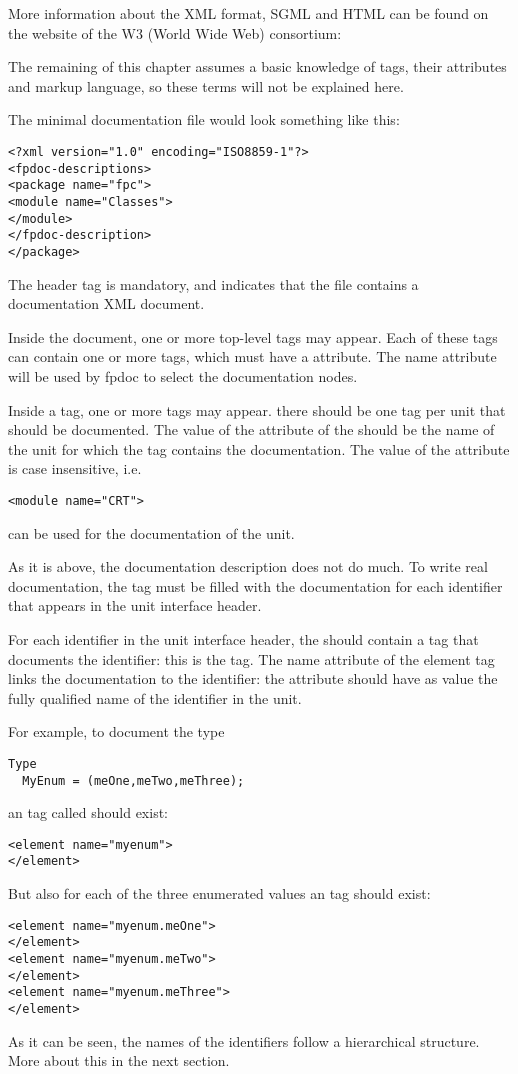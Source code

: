 More information about the XML format, SGML and HTML can be found on the 
website of the W3 (World Wide Web) consortium:  

The remaining of this chapter assumes a basic knowledge of tags, their
attributes and markup language, so these terms will not be explained here. 

The minimal documentation file would look something like this:
\begin{verbatim}
<?xml version="1.0" encoding="ISO8859-1"?>
<fpdoc-descriptions>
<package name="fpc">
<module name="Classes">
</module>
</fpdoc-description>
</package>
\end{verbatim}
The header  tag is mandatory, and indicates that the file contains a
documentation XML document.

Inside the document, one or more top-level  
tags may appear. Each of these tags can contain one or more 
tags, which must have a  attribute. The name attribute will be
used by fpdoc to select the documentation nodes.

Inside a  tag, one or more  tags may appear. there
should be one  tag per unit that should be documented. The value
of the  attribute of the  should be the name of the
unit for which the  tag contains the documentation. The value
of the  attribute is case insensitive, i.e. 
\begin{verbatim}
<module name="CRT">
\end{verbatim}
can be used for the documentation of the  unit.

As it is above, the documentation description does not do much. To write
real documentation, the  tag must be filled with the
documentation for each identifier that appears in the unit interface header.

For each identifier in the unit interface header, the  should
contain a tag that documents the identifier: this is the  tag.
The name attribute of the element tag links the documentation to the
identifier: the  attribute should have as value the fully
qualified name of the identifier in the unit.

For example, to document the type
\begin{verbatim}
Type
  MyEnum = (meOne,meTwo,meThree);
\end{verbatim}
an  tag called  should exist:
\begin{verbatim}
<element name="myenum">
</element>
\end{verbatim}
But also for each of the three enumerated values an  tag should 
exist:
\begin{verbatim}
<element name="myenum.meOne">
</element>
<element name="myenum.meTwo">
</element>
<element name="myenum.meThree">
</element>
\end{verbatim}
As it can be seen, the names of the identifiers follow a hierarchical
structure. More about this in the next section.

